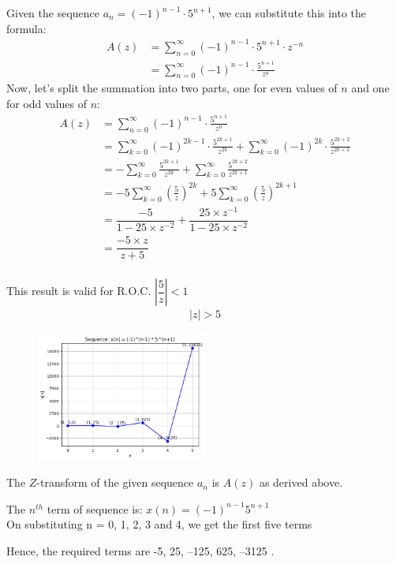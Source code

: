 \documentclass[journal,12pt,twocolumn]{IEEEtran}
\theoremstyle{remark}
\begin{document}
Given the sequence $a_n = (-1)^{n-1} \cdot 5^{n+1}$, we can substitute this into the formula:
\begin{align}
A(z) &= \sum_{n=0}^{\infty} (-1)^{n-1} \cdot 5^{n+1} \cdot z^{-n} \\ 
 &= \sum_{n=0}^{\infty} (-1)^{n-1} \cdot \frac{5^{n+1}}{z^n} 
\end{align}
Now, let's split the summation into two parts, one for even values of $n$ and one for odd values of $n$:
\begin{align}
 A(z) &= \sum_{n=0}^{\infty} (-1)^{n-1} \cdot \frac{5^{n+1}}{z^n} \\
  &= \sum_{k=0}^{\infty} (-1)^{2k-1} \cdot \frac{5^{2k+1}}{z^{2k}} + \sum_{k=0}^{\infty} (-1)^{2k} \cdot \frac{5^{2k+2}}{z^{2k+1}} \\
 &= -\sum_{k=0}^{\infty} \frac{5^{2k+1}}{z^{2k}} + \sum_{k=0}^{\infty} \frac{5^{2k+2}}{z^{2k+1}} \\
&= -5\sum_{k=0}^{\infty} \left(\frac{5}{z}\right)^{2k} + 5\sum_{k=0}^{\infty} \left(\frac{5}{z}\right)^{2k+1} \\
&=\dfrac{-5}{1 - 25 \times z^{-2}} + \dfrac{25 \times z^{-1}}{1 - 25 \times z^{-2}} \\
&=\dfrac{-5 \times z}{z+5} \\
\end{align}

This result is valid for R.O.C. $\left| \dfrac{5 }{ z }\right| < 1$ \\
\begin{align}
|z| > 5
\end{align}



\begin{figure}
  \centering
  \includegraphics[width=0.5\textwidth]{grasi2.png} 
 
\end{figure}

The $Z$-transform of the given sequence $a_n$ is $A(z)$ as derived above.




















The $n^{th}$ term of sequence is: $x(n) = (-1)^{n-1}5^{n+1}$\\
On substituting n = 0, 1, 2, 3 and 4, we get the first five terms 

Hence, the required terms are -5, 25, –125, 625, –3125 .
\end{document}
